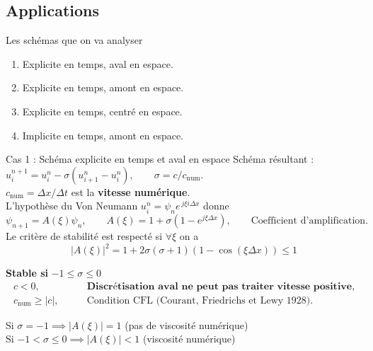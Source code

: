 \documentclass[aspectratio=169, french]{beamer}
\begin{document}
\subsection{Applications}

\begin{frame}{Les schémas que on va analyser}
\begin{enumerate}
	\item Explicite en temps, aval en espace.
	\item Explicite en temps, amont en espace.
	\item Explicite en temps, centré en espace.
	\item Implicite en temps, amont en espace.
\end{enumerate} 
\end{frame}


\begin{frame}{Cas 1 : Schéma explicite en temps et aval en espace}
Schéma résultant : 
$u_{i}^{n+1} = u_{i}^n - \sigma(u_{i+1}^n - u_{i}^{n}), \qquad \sigma = c/c_{\mathrm{num}}$. \\ $c_{\mathrm{num}} = \Delta x/\Delta t$ est la \textbf{vitesse numérique}. \\
L'hypothèse du Von Neumann $u_{i}^{n} = \psi_n e^{\, j  \xi  i  \Delta x}$ donne 
\begin{equation*}
\psi_{n+1} = A(\xi) \psi_n, \qquad	A(\xi) = 1 + \sigma(1 - e^{j  \xi \Delta x}), \qquad \text{Coefficient d'amplification}.
\end{equation*}
Le critère de stabilité est respecté si $\forall \xi$ on a
\begin{equation*}
	|A(\xi)|^2 = 1 + 2 \sigma(\sigma + 1)(1 - \cos(\xi \Delta x))\le 1   
\end{equation*}
\begin{tcolorbox}[title=Conditions de stabilité, coltitle=white]
		 \textbf{Stable si } $-1 \le \sigma \le 0$
\begin{equation*}
	\begin{aligned}
		c<0, \\
		c_{\mathrm{num}}\ge|c|, 
	\end{aligned}
	\qquad 
	\begin{aligned}
		\textbf{Discrétisation aval ne peut pas traiter vitesse positive}, \\
		\text{Condition CFL (Courant, Friedrichs et Lewy 1928).}
	\end{aligned}
\end{equation*}

\end{tcolorbox}

Si $\sigma=-1 \implies |A(\xi)|=1$ \hspace{.5cm} (pas de viscosité numérique)\\
Si $-1 < \sigma \le 0 \implies |A(\xi)|<1$ \hspace{.5cm} (viscosité numérique)

\end{frame}
\end{document}
